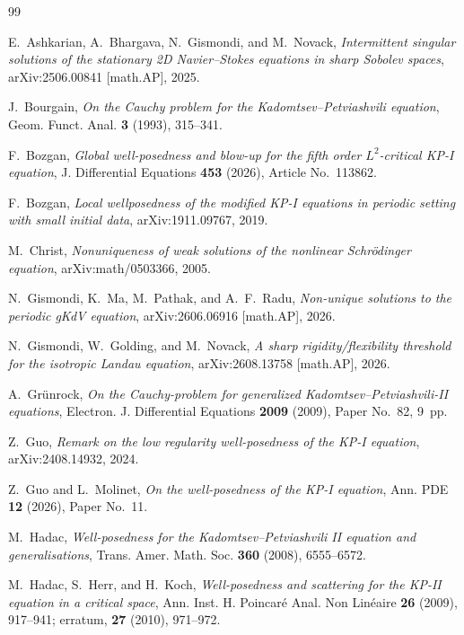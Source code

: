 \documentclass[12pt,reqno,letterpaper]{amsart}
\numberwithin{equation}{section}
\theoremstyle{definition}
\begin{document}
\begin{thebibliography}{99}

E.~Ashkarian, A.~Bhargava, N.~Gismondi, and M.~Novack,
\emph{Intermittent singular solutions of the stationary 2D
Navier--Stokes equations in sharp Sobolev spaces},
arXiv:2506.00841 [math.AP], 2025.

J.~Bourgain,
\emph{On the Cauchy problem for the Kadomtsev--Petviashvili equation},
Geom. Funct. Anal. \textbf{3} (1993), 315--341.

F.~Bozgan,
\emph{Global well-posedness and blow-up for the fifth order
$L^2$-critical KP-I equation},
J. Differential Equations \textbf{453} (2026), Article No.~113862.

F.~Bozgan,
\emph{Local wellposedness of the modified KP-I equations in periodic
setting with small initial data},
arXiv:1911.09767, 2019.

M.~Christ,
\emph{Nonuniqueness of weak solutions of the nonlinear Schr\"odinger
equation},
arXiv:math/0503366, 2005.

N.~Gismondi, K.~Ma, M.~Pathak, and A.~F.~Radu,
\emph{Non-unique solutions to the periodic gKdV equation},
arXiv:2606.06916 [math.AP], 2026.

N.~Gismondi, W.~Golding, and M.~Novack,
\emph{A sharp rigidity/flexibility threshold for the isotropic Landau
equation}, arXiv:2608.13758 [math.AP], 2026.

A.~Gr\"unrock,
\emph{On the Cauchy-problem for generalized
Kadomtsev--Petviashvili-II equations},
Electron. J. Differential Equations \textbf{2009} (2009),
Paper No.~82, 9~pp.

Z.~Guo,
\emph{Remark on the low regularity well-posedness of the KP-I equation},
arXiv:2408.14932, 2024.

Z.~Guo and L.~Molinet,
\emph{On the well-posedness of the KP-I equation},
Ann. PDE \textbf{12} (2026), Paper No.~11.

M.~Hadac,
\emph{Well-posedness for the Kadomtsev--Petviashvili II equation and
generalisations},
Trans. Amer. Math. Soc. \textbf{360} (2008), 6555--6572.

M.~Hadac, S.~Herr, and H.~Koch,
\emph{Well-posedness and scattering for the KP-II equation in a critical
space},
Ann. Inst. H. Poincar\'e Anal. Non Lin\'eaire \textbf{26} (2009), 917--941;
erratum, \textbf{27} (2010), 971--972.


\end{thebibliography}
\end{document}
